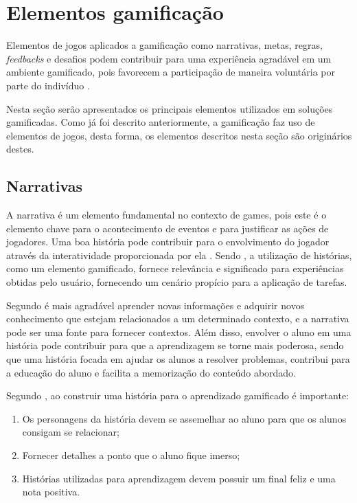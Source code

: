 \documentclass[
	12pt,				%
	oneside,			%
	a4paper,			%
	english,			%
	french,				%
	spanish,			%
	brazil,				%
	]{abntex2}
\begin{document}
\section{Elementos gamificação}

Elementos de jogos aplicados a gamificação como narrativas, metas, regras, \textit{feedbacks} e desafios podem contribuir para uma experiência agradável em um ambiente gamificado, pois favorecem a participação de maneira voluntária por parte do indivíduo \cite{busarello2016gamificaccao}.

Nesta seção serão apresentados os principais elementos utilizados em soluções gamificadas. Como já foi descrito anteriormente, a gamificação faz uso de elementos de jogos, desta forma, os elementos descritos nesta seção são originários destes.

\subsection{Narrativas}

A narrativa é um elemento fundamental no contexto de games, pois este é o elemento chave para o acontecimento de eventos e para justificar as ações de jogadores. Uma boa história pode contribuir para o envolvimento do jogador através da interatividade proporcionada por ela  \cite{fardo2013gamificaccao}. Sendo \citet{kaap:2014}, a utilização de histórias, como um elemento gamificado, fornece relevância e significado para experiências obtidas pelo usuário, fornecendo um cenário propício para a aplicação de tarefas.

Segundo \citet{fardo2013gamificaccao} é mais agradável aprender novas informações e adquirir novos conhecimento que estejam relacionados a um determinado contexto, e a narrativa pode ser uma fonte para fornecer contextos. Além disso, envolver o aluno em uma história pode contribuir para que a aprendizagem se torne mais poderosa, sendo que uma história focada em ajudar os alunos a resolver problemas, contribui para a educação do aluno e facilita a memorização do conteúdo abordado.

Segundo \citet{andre2018}, ao construir uma história para o aprendizado gamificado é importante:
\begin{enumerate}
\item Os personagens da história devem se assemelhar ao aluno para que os alunos consigam se relacionar;
\item Fornecer detalhes a ponto que o aluno fique imerso;
\item Histórias utilizadas para aprendizagem devem possuir um final feliz e uma nota positiva.
\end{enumerate}
\end{document}
